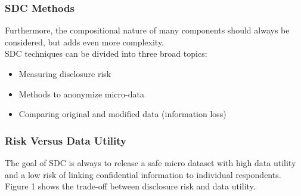 \documentclass{beamer}
\begin{document}
	\begin{frame}
		\frametitle{SDC Methods} 
		Furthermore, the compositional nature of many components
		should always be considered, but adds even more complexity.\\ \bigskip
		SDC techniques can be divided into three broad topics:
		\begin{itemize}
			\item Measuring disclosure risk %
			\item Methods to anonymize micro-data %
			\item Comparing original and modiﬁed data (information loss) %
		\end{itemize}
	\end{frame}
\begin{frame}
	\frametitle{Risk Versus Data Utility}
	The goal of SDC is always to release a safe micro dataset with high data utility and
	a low risk of linking conﬁdential information to individual respondents. Figure 1
	shows the trade-off between disclosure risk and data utility. 
	
\end{frame}
\end{document}
